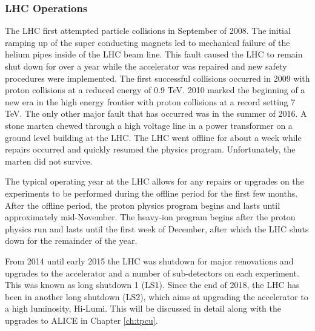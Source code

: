 \subsubsection{LHC Operations}
The LHC first attempted particle collisions in September of 2008.  The initial ramping up of the super conducting magnets led to mechanical failure of the helium pipes inside of the LHC beam line.  This fault caused the LHC to remain shut down for over a year while the accelerator was repaired and new safety procedures were implemented. The first successful collisions occurred in 2009 with proton collisions at a reduced energy of 0.9 TeV.  2010 marked the beginning of a new era in the high energy frontier with proton collisions at a record setting 7 TeV.  The only other major fault that has occurred was in the summer of 2016. A stone marten chewed through a high voltage line in a power transformer on a ground level building at the LHC.  The LHC went offline for about a week while repairs occurred and quickly resumed the physics program.  Unfortunately, the marten did not survive.

The typical operating year at the LHC allows for any repairs or upgrades on the experiments to be performed during the offline period for the first few months.  After the offline period, the proton physics program begins and lasts until approximately mid-November.  The heavy-ion program begins after the proton physics run and lasts until the first week of December, after which the LHC shuts down for the remainder of the year.  

From 2014 until early 2015 the LHC was shutdown for major renovations and upgrades to the accelerator and a number of sub-detectors on each experiment. This was known as long shutdown 1 (LS1).  Since the end of 2018, the LHC has been in another long shutdown (LS2), which aims at upgrading the accelerator to a high luminosity, Hi-Lumi.  This will be discussed in detail along with the upgrades to ALICE in Chapter \ref{ch:tpcu}.

